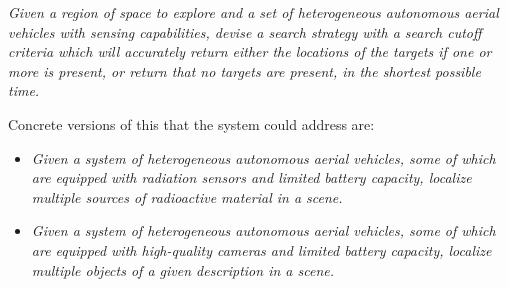 \textit{Given a region of space to explore and a set of heterogeneous autonomous aerial vehicles with sensing capabilities, devise a search strategy with a search cutoff criteria which will accurately return either the locations of the targets if one or more is present, or return that no targets are present, in the shortest possible time.} \par

Concrete versions of this that the system could address are:
\begin{itemize}
    \item \textit{Given a system of heterogeneous autonomous aerial vehicles, some of which are equipped with radiation sensors and limited battery capacity, localize multiple sources of radioactive material in a scene.}
    \item \textit{Given a system of heterogeneous autonomous aerial vehicles, some of which are equipped with high-quality cameras and limited battery capacity, localize multiple objects of a given description in a scene.}
\end{itemize}
\par


